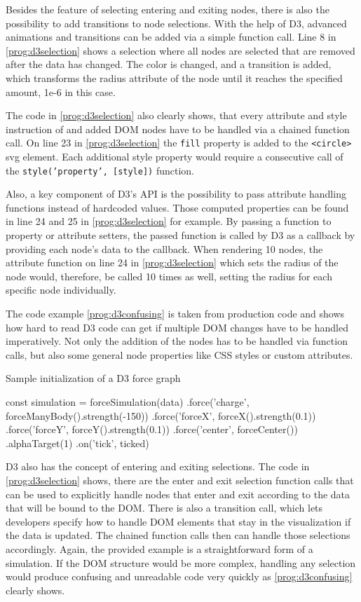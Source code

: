 Besides the feature of selecting entering and exiting nodes, there is also the possibility to add transitions to node selections. With the help of D3, advanced animations and transitions can be added via a simple function call. Line 8 in \ref{prog:d3selection} shows a selection where all nodes are selected that are removed after the data has changed. The color is changed, and a transition is added, which transforms the radius attribute of the node until it reaches the specified amount, 1e-6 in this case.

The code in \ref{prog:d3selection} also clearly shows, that every attribute and style instruction of and added DOM nodes have to be handled via a chained function call. On line 23 in \ref{prog:d3selection} the \texttt{fill} property is added to the \texttt{<circle>} svg element. Each additional style property would require a consecutive call of the \texttt{style('property', [style])} function.

Also, a key component of D3's API is the possibility to pass attribute handling functions instead of hardcoded values. Those computed properties can be found in line 24 and 25 in \ref{prog:d3selection} for example. By passing a function to property or attribute setters, the passed function is called by D3 as a callback by providing each node's data to the callback. When rendering 10 nodes, the attribute function on line 24 in \ref{prog:d3selection} which sets the radius of the node would, therefore, be called 10 times as well, setting the radius for each specific node individually.

The code example \ref{prog:d3confusing} is taken from production code and shows how hard to read D3 code can get if multiple DOM changes have to be handled imperatively. Not only the addition of the nodes has to be handled via function calls, but also some general node properties like CSS styles or custom attributes.

\begin{program}
\caption{Sample initialization of a D3 force graph}
\label{prog:d3forceinit}
\begin{JsCode}
const simulation = forceSimulation(data)
  .force('charge', forceManyBody().strength(-150))
  .force('forceX', forceX().strength(0.1))
  .force('forceY', forceY().strength(0.1))
  .force('center', forceCenter())
  .alphaTarget(1)
  .on('tick', ticked)
\end{JsCode}
\end{program}

D3 also has the concept of entering and exiting selections. The code in \ref{prog:d3selection} shows, there are the enter and exit selection function calls that can be used to explicitly handle nodes that enter and exit according to the data that will be bound to the DOM. There is also a transition call, which lets developers specify how to handle DOM elements that stay in the visualization if the data is updated. The chained function calls then can handle those selections accordingly. Again, the provided example is a straightforward form of a simulation. If the DOM structure would be more complex, handling any selection would produce confusing and unreadable code very quickly as \ref{prog:d3confusing} clearly shows.

